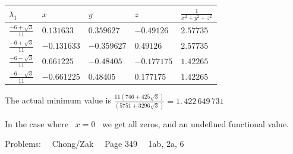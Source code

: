 \documentclass[12pt,thmsa]{article}
\begin{document}
\begin{enumerate}
\begin{tabular}{|l|l|l|l|l|}
\hline
$\lambda _{1}$ & $x$ & $y$ & $z$ & $\frac{1}{x^{2}+y^{2}+z^{2}}$ \\ \hline
$\frac{-6+\sqrt{3}}{11}$ & $0.131633$ & $0.359627$ & $-0.49126$ & $2.57735$
\\ \hline
$\frac{-6+\sqrt{3}}{11}$ & $-0.131633$ & $-0.359627$ & $0.49126$ & $2.57735$
\\ \hline
$\frac{-6-\sqrt{3}}{11}$ & $0.661225$ & $-0.48405$ & $-0.177175$ & $1.42265$
\\ \hline
$\frac{-6-\sqrt{3}}{11}$ & $-0.661225$ & $0.48405$ & $0.177175$ & $1.42265$
\\ \hline
\end{tabular}

The actual minimum value is $\frac{11(746+425\sqrt{3})}{(5751+3296\sqrt{3})}%
=\allowbreak 1.\,\allowbreak 422\,649\,731$

In the case where \ $x=0$ \ we get all zeros, and an undefined functional
value.
\end{enumerate}

\vspace{1pt}

\vspace{1pt}

\vspace{1pt}

Problems: \ \ Chong/Zak \ \ Page 349 \ \ 1ab, 2a, 6
\end{document}
